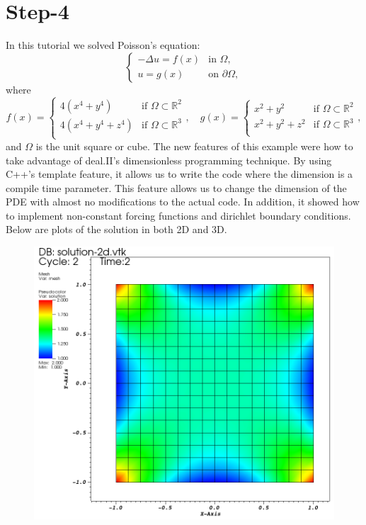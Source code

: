 \documentclass[11pt,fullpage]{article}
\newcommand{\lap}{\Delta}
\newcommand{\Real}{\mathbb R}
\theoremstyle{lemma}
\theoremstyle{definition}
\theoremstyle{lemma}
\begin{document}
\section*{Step-4}
In this tutorial we solved Poisson's equation:
$$
\begin{cases}
-\lap u = f(x) &\text{in }\Omega,\\
u = g(x) & \text{on }\partial\Omega,
\end{cases}
$$
where 
$$
f(x) = \begin{cases}
4(x^4 + y^4) & \text{if } \Omega \subset \Real^2\\
4(x^4 + y^4 + z^4) & \text{if } \Omega \subset \Real^3\\
\end{cases}, \quad 
g(x) = \begin{cases}
x^2 + y^2 & \text{if } \Omega \subset \Real^2\\
x^2 + y^2 + z^2 & \text{if } \Omega \subset \Real^3\\
\end{cases},
$$ and $\Omega$ is the unit square or cube. The new features of this example were how to take advantage of deal.II's dimensionless programming technique. By using C++'s template feature, it allows us to write the code where the dimension is a compile time parameter. This feature allows us to change the dimension of the PDE with almost no modifications to the actual code. In addition, it showed how to implement non-constant forcing functions and dirichlet boundary conditions. Below are plots of the solution in both 2D and 3D.

\begin{figure}[!ht]
	\centering
	\includegraphics[scale=.7]{Step4-2d.png}
\end{figure}
\end{document}
